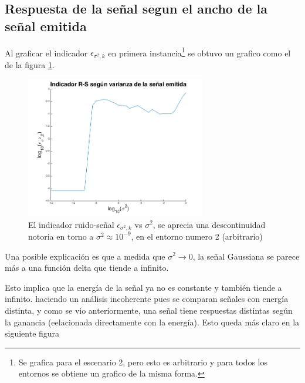\documentclass[letterpaper,11pt]{article}
\begin{document}
\subsection{Respuesta de la señal segun el ancho de la señal emitida}

Al graficar el indicador $\epsilon_{\sigma^2,k}$ en primera instancia\footnote{Se grafica para el escenario 2, pero esto es arbitrario y para todos los entornos se obtiene un grafico de la misma forma.} se obtuvo un grafico como el de la figura \ref{error}.

\begin{figure}[H]
\centering
\includegraphics[width=0.7\textwidth]{img/parte_d/curvad2.png}
\caption{El indicador ruido-señal $\epsilon_{\sigma^2,k}$ vs $\sigma^2$, se aprecia una descontinuidad notoria en torno a $\sigma^2 \approx 10^{-9}$, en el entorno numero 2 (arbitrario)}
\label{error}
\end{figure}

Una posible explicación es que a medida que $\sigma^2 \to 0$, la señal Gaussiana se parece más a una función delta que tiende a infinito.

Esto implica que la energía de la señal ya no es constante y también tiende a infinito. haciendo un análisis incoherente pues se comparan señales con energía distinta, y como se vio anteriormente, una señal tiene respuestas distintas según la ganancia (eelacionada directamente con la energía). Esto queda más claro en la siguiente figura
\end{document}
